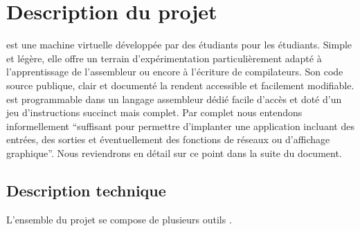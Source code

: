 \documentclass[11pt,twoside]{article}
\begin{document}
\vfill
\hspace{0pt}
\newpage{}

\section{Description du projet}

 est une machine virtuelle développée par des étudiants pour les
étudiants. Simple et légère, elle offre un terrain d'expérimentation
particulièrement adapté à l'apprentissage de l'assembleur ou encore
à l'écriture de compilateurs. Son code source publique, clair et documenté
la rendent accessible et facilement modifiable.  est programmable
dans un langage assembleur dédié facile d'accès et doté d'un jeu d'instructions
succinct mais complet. Par complet nous entendons informellement ``suffisant pour permettre d'implanter une application incluant des entrées, des sorties et éventuellement des fonctions de réseaux ou d'affichage graphique''. Nous reviendrons en détail sur ce point dans la suite du document.

\subsection{Description technique}

L'ensemble du projet  se compose de plusieurs outils .
\end{document}
